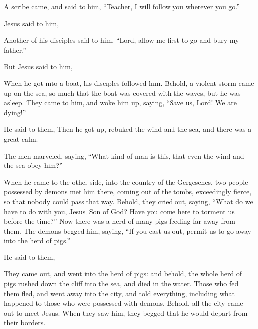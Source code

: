 {\par }{\PP {}A scribe came, and said to him, “Teacher, I will follow you wherever you go.”
\par }{\PP {}Jesus said to him,
{}
\par }{\PP {}Another of his disciples said to him, “Lord, allow me first to go and bury my father.”
\par }{\PP {}But Jesus said to him,
{}
\par }{\PP {}When he got into a boat, his disciples followed him.
Behold, a violent storm came up on the sea, so much that the boat was covered with the waves, but he was asleep.
They came to him, and woke him up, saying, “Save us, Lord! We are dying!”
\par }{\PP {}He said to them,
{} Then he got up, rebuked the wind and the sea, and there was a great calm.
\par }{\PP {}The men marveled, saying, “What kind of man is this, that even the wind and the sea obey him?”
\par }{\PP {}When he came to the other side, into the country of the Gergesenes,
 two people possessed by demons met him there, coming out of the tombs, exceedingly fierce, so that nobody could pass that way.
Behold, they cried out, saying, “What do we have to do with you, Jesus, Son of God? Have you come here to torment us before the time?”
Now there was a herd of many pigs feeding far away from them.
The demons begged him, saying, “If you cast us out, permit us to go away into the herd of pigs.”
\par }{\PP {}He said to them,
{}
\par }{\PP They came out, and went into the herd of pigs: and behold, the whole herd of pigs rushed down the cliff into the sea, and died in the water.
Those who fed them fled, and went away into the city, and told everything, including what happened to those who were possessed with demons.
Behold, all the city came out to meet Jesus. When they saw him, they begged that he would depart from their borders.

}
